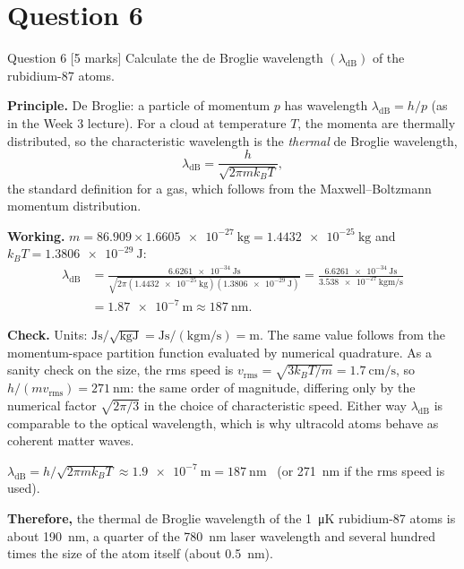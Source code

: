 \documentclass[11pt]{article}
\newcommand{\closing}[1]{\par\medskip\noindent\textbf{Therefore,} #1}
\begin{document}
\section{Question 6}

\begin{problembox}{Question 6 \hfill [5 marks]}
Calculate the de Broglie wavelength $(\lambda_{\mathrm{dB}})$ of the rubidium-87 atoms.
\end{problembox}

\textbf{Principle.} De Broglie: a particle of momentum $p$ has wavelength $\lambda_{\mathrm{dB}} = h/p$
(as in the Week 3 lecture). For a cloud at temperature $T$, the momenta are thermally distributed,
so the characteristic wavelength is the \emph{thermal} de Broglie wavelength,
\[
\lambda_{\mathrm{dB}} = \frac{h}{\sqrt{2\pi m k_B T}},
\]
the standard definition for a gas, which follows from the Maxwell--Boltzmann momentum distribution.

\textbf{Working.} $m = 86.909\times\SI{1.6605e-27}{\kilogram} = \SI{1.4432e-25}{\kilogram}$ and
$k_BT = \SI{1.3806e-29}{\joule}$:
\begin{align*}
\lambda_{\mathrm{dB}} &= \frac{\SI{6.6261e-34}{\joule\second}}
{\sqrt{2\pi(\SI{1.4432e-25}{\kilogram})(\SI{1.3806e-29}{\joule})}}
= \frac{\SI{6.6261e-34}{\joule\second}}{\SI{3.538e-27}{\kilogram\metre\per\second}}\\
&= \SI{1.87e-7}{\metre} \approx \SI{187}{\nano\metre}.
\end{align*}

\textbf{Check.} Units: $\si{\joule\second}/\sqrt{\si{\kilogram\joule}} = \si{\joule\second}/(\si{\kilogram\metre\per\second}) = \si{\metre}$.
The same value follows from the momentum-space partition function evaluated by numerical
quadrature. As a sanity check on the size, the rms speed is $v_{\mathrm{rms}} = \sqrt{3k_BT/m} =
\SI{1.7}{\centi\metre\per\second}$, so $h/(m v_{\mathrm{rms}}) = \SI{271}{\nano\metre}$: the same order
of magnitude, differing only by the numerical factor $\sqrt{2\pi/3}$ in the choice of
characteristic speed. Either way $\lambda_{\mathrm{dB}}$ is comparable to the optical wavelength,
which is why ultracold atoms behave as coherent matter waves.

\begin{answerbox}
$\lambda_{\mathrm{dB}} = h/\sqrt{2\pi m k_BT} \approx \SI{1.9e-7}{\metre} = \SI{187}{\nano\metre}$
\ (or \SI{271}{\nano\metre} if the rms speed is used).
\closing{the thermal de Broglie wavelength of the \SI{1}{\micro\kelvin} rubidium-87 atoms is about
\SI{190}{\nano\metre}, a quarter of the \SI{780}{\nano\metre} laser wavelength and several hundred
times the size of the atom itself (about \SI{0.5}{\nano\metre}).}
\end{answerbox}
\end{document}
